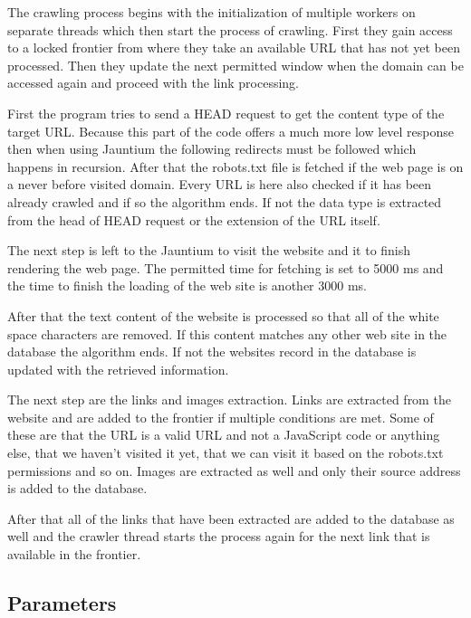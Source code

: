 \documentclass[9pt]{IEEEtran}
\begin{document}
The crawling process begins with the initialization of multiple workers on separate threads which then start the process of crawling.
First they gain access to a locked frontier from where they take an available URL that has not yet been processed.
Then they update the next permitted window when the domain can be accessed again and proceed with the link processing.

First the program tries to send a HEAD request to get the content type of the target URL.
Because this part of the code offers a much more low level response then when using Jauntium the following redirects must be followed which happens in recursion.
After that the robots.txt file is fetched if the web page is on a never before visited domain.
Every URL is here also checked if it has been already crawled and if so the algorithm ends.
If not the data type is extracted from the head of HEAD request or the extension of the URL itself.

The next step is left to the Jauntium to visit the website and it to finish rendering the web page.
The permitted time for fetching is set to 5000 ms and the time to finish the loading of the web site is another 3000 ms. 

After that the text content of the website is processed so that all of the white space characters are removed. 
If this content matches any other web site in the database the algorithm ends.
If not the websites record in the database is updated with the retrieved information.

The next step are the links and images extraction.
Links are extracted from the website and are added to the frontier if multiple conditions are met.
Some of these are that the URL is a valid URL and not a JavaScript code or anything else, that we haven't visited it yet, that we can visit it based on the robots.txt permissions and so on.
Images are extracted as well and only their source address is added to the database.

After that all of the links that have been extracted are added to the database as well and the crawler thread starts the process again for the next link that is available in the frontier.

\subsection{Parameters}
\end{document}
